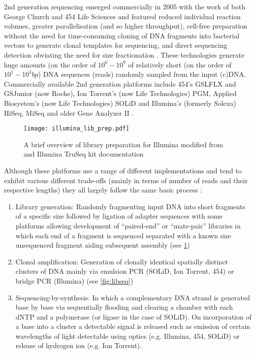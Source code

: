 2nd generation sequencing emerged commercially in 2005 with the work
of both George Church and 454 Life Sciences \citep{Margulies2005} and featured
reduced individual reaction volumes, greater parallelisation (and so higher throughput),
cell-free preparation without the need for time-consuming cloning of DNA fragments into bacterial vectors to generate
clonal templates for sequencing, and direct sequencing detection obviating the need
for size fractionation \citep{Jaszczyszyn2014}.
These technologies generate huge amounts (on the order of \(10^{6}-10^{9}\) of relatively short (on the order of \(10^{1}-10^{3}bp\)) DNA sequences 
    (reads) randomly sampled from the input (c)DNA.  
Commercially available 2nd generation platforms include 454's GSLFLX and GSJunior (now Roche),
Ion Torrent's (now Life Technologies) PGM, Applied Biosystem's (now Life Technologies) SOLiD and Illumina's (formerly Solexa) 
HiSeq, MiSeq and older Gene Analyzer II \citep{Nederbragt2012}.

\begin{figure}
    \texttt{[image: illumina\_lib\_prep.pdf]}
    \label{fig:libprep}
    \caption{A brief overview of library preparation for Illumina modified from \citep{Mardis2008} and Illumina TruSeq kit documentation} 
\end{figure}

Although these platforms use a range of different implementations and tend to exhibit various different trade-offs (mainly in terms
of number of reads and their respective lengths) they all largely follow the same basic process \citep{Shendure2008}:
\begin{enumerate}
        \item Library generation: Randomly fragmenting input DNA into short fragments of a specific size
            followed by ligation of adapter sequences with some platforms allowing development of ``paired-end'' or ``mate-pair'' libraries in which
            each end of a fragment is sequenced separated with a known size unsequenced fragment aiding subsequent assembly (see \ref{fig:libprep})
        \item Clonal amplification: Generation of clonally identical spatially distinct clusters of DNA mainly via emulsion PCR \citep{Dressman2003} (SOLiD, Ion Torrent, 454)
            or bridge PCR \citep{Adessi2000,Fedurco2006} (Illumina) (see \ref{fig:libseq})
        \item Sequencing-by-synthesis: In which a complementary DNA strand is generated base by base via sequentially flooding and clearing a
            chamber with each dNTP and a polymerase (or ligase in the case of SOLiD).  On incorporation of a base into a cluster a detectable signal is released such as emission of certain wavelengths of light 
detectable using optics (e.g. Illumina, 454, SOLiD) or release of hydrogen ion (e.g. Ion Torrent).
\end{enumerate}

